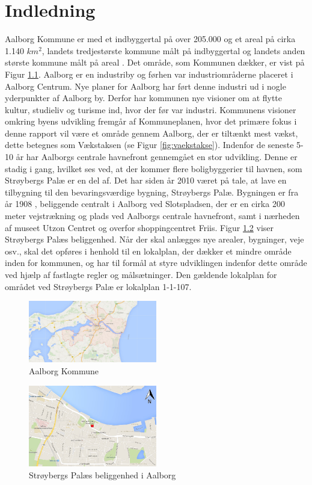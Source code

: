 \chapter{Indledning}
Aalborg Kommune er med et indbyggertal på over 205.000 og et areal på cirka  1.140 $km^2$, landets tredjestørste kommune målt på indbyggertal og landets anden største kommune målt på areal \citep{indbyggertal}. Det område, som Kommunen dækker, er vist på Figur \ref{fig:aalborgkommune}. 
\newline \indent{     }  Aalborg er en industriby og førhen var industriområderne placeret i Aalborg Centrum. Nye planer for Aalborg har ført denne industri ud i nogle yderpunkter af Aalborg by. Derfor har kommunen nye visioner om at flytte kultur, studieliv og turisme ind, hvor der før var industri. Kommunens visioner omkring byens udvikling fremgår af Kommuneplanen, hvor det primære fokus i denne rapport vil være et område gennem Aalborg, der er tiltænkt mest vækst, dette betegnes som Vækstaksen (se Figur \ref{fig:vaekstakse}).
\newline \indent{     }  Indenfor de seneste 5-10 år har Aalborgs centrale havnefront gennemgået en stor udvikling. Denne er stadig i gang, hvilket ses ved, at der kommer flere boligbyggerier til havnen, som Strøybergs Palæ er en del af. 
\newline \indent{     }  Det har siden år 2010 været på tale, at lave en tilbygning til den bevaringsværdige bygning, Strøybergs Palæ. Bygningen er fra år 1908 \citep{byggesagen}, beliggende centralt i Aalborg ved Slotspladsen, der er en cirka 200 meter vejstrækning og plads ved Aalborgs centrale havnefront, samt i nærheden af museet Utzon Centret og overfor shoppingcentret Friis. Figur \ref{fig:aalborg} viser Strøybergs Palæs beliggenhed. 
\newline \indent{     }  Når der skal anlægges nye arealer, bygninger, veje osv., skal det opføres i henhold til en lokalplan, der dækker et mindre område inden for kommunen, og har til formål at styre udviklingen indenfor dette område ved hjælp af fastlagte regler og målsætninger. Den gældende lokalplan for området ved Strøybergs Palæ er lokalplan 1-1-107. 
\begin{figure}[htbp]
	\centering
	\includegraphics[width=0.5\textwidth]{billeder/aalborgkommune.png}
	\caption{Aalborg Kommune}
	\label{fig:aalborgkommune}
\end{figure}
\begin{figure}[htbp]
	\centering
	\includegraphics[width=0.5\textwidth]{billeder/aalborg.png}
	\caption{Strøybergs Palæs beliggenhed i Aalborg}
	\label{fig:aalborg}
\end{figure}